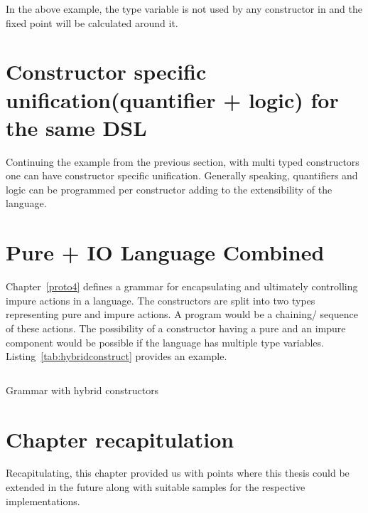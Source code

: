 \documentclass[thesis-solanki.tex]{subfiles}
\begin{document}
In the above example, the  type variable is not used by any constructor in  and the fixed 
point will be calculated around it. 

\section{Constructor specific unification(quantifier + logic) for the same DSL}
Continuing the example from the previous section, with multi typed constructors one can have constructor specific unification. Generally 
speaking, quantifiers and logic can be programmed per constructor adding to the extensibility of the language.   

\section{Pure + IO Language Combined}
Chapter~\ref{proto4} defines a grammar for encapsulating and ultimately controlling impure actions in a language. The constructors are split
into two types representing pure and impure actions. A program would be a chaining/ sequence of these actions. The possibility of a 
constructor having a pure and an impure component would be possible if the language has multiple type variables. 
Listing~\ref{tab:hybridconstruct} provides an example.


\begin{code-list}[H]
\begin{singlespace}
\inputminted{haskell}{haskell-proto4-hybrid-construct.hs}
\end{singlespace}
\caption{Grammar with hybrid constructors}
\label{tab:hybridconstruct}
\end{code-list}

\section{Chapter recapitulation}
Recapitulating, this chapter provided us with points where this thesis could be extended in the future along with suitable samples for the
respective implementations.


\ifMain\ifDraft
\begin{scope}
  \nolinenumbers
  \enotesize
  \par
  \begin{singlespace}
  \setlength{\parskip}{12pt plus 2pt minus 1pt}
  \theendnotes
  \par
  \end{singlespace}
\end{scope}
\fi\fi
\end{document}
